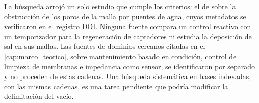 La b\'usqueda arroj\'o un solo estudio que cumple los criterios: el de \textcite{park2021clogged} sobre la obstrucci\'on de los poros de la malla por puentes de agua, cuyos metadatos se verificaron en el registro DOI. Ninguna fuente compara un control reactivo con un temporizador para la regeneraci\'on de captadores ni estudia la deposici\'on de sal en sus mallas. Las fuentes de dominios cercanos citadas en el \cref{cap:marco_teorico}, sobre mantenimiento basado en condici\'on, control de limpieza de membranas e impedancia como sensor, se identificaron por separado y no proceden de estas cadenas. Una b\'usqueda sistem\'atica en bases indexadas, con las mismas cadenas, es una tarea pendiente que podr\'ia modificar la delimitaci\'on del vac\'io.



